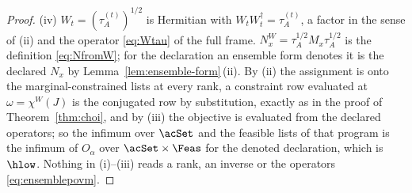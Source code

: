 \begin{proof}
(iv) $W_t=(\tau^{(t)}_A)^{1/2}$ is Hermitian with $W_tW_t^{\dagger}
=\tau^{(t)}_A$, a factor in the sense of (ii) and the operator
\eqref{eq:Wtau} of the full frame. $N^{W}_x=\tau_A^{1/2}M_x\tau_A^{1/2}$ is
the definition \eqref{eq:NfromW}; for the declaration an ensemble form
denotes it is the declared $N_x$ by Lemma~\ref{lem:ensemble-form}\,(ii). By
(ii) the assignment is onto the marginal-constrained lists at every rank, a
constraint row evaluated at $\omega=\chi^{W}(J)$ is the conjugated row by
substitution, exactly as in the proof of Theorem~\ref{thm:choi}, and by (iii)
the objective is evaluated from the declared operators; so the infimum over
$\acSet$ and the feasible lists of that program is the infimum of $O_{\alpha}$ over
$\acSet\times\Feas$ for the denoted declaration, which is $\hlow$. Nothing in
(i)--(iii) reads a rank, an inverse or the operators
\eqref{eq:ensemblepovm}.
\end{proof}
